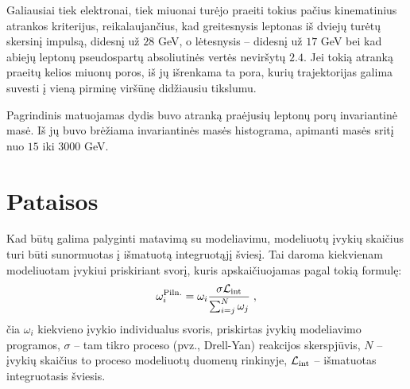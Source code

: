 \documentclass[a4paper, 12pt]{article}
\newcommand{\Lumi}{{\cal L}_\mathrm{int}}
\newlength\q
\begin{document}
Galiausiai tiek elektronai, tiek miuonai turėjo praeiti tokius pačius kinematinius atrankos kriterijus,
reikalaujančius, kad greitesnysis leptonas iš dviejų turėtų skersinį impulsą, didesnį už $28$ GeV, o lėtesnysis --
didesnį už $17$ GeV bei kad abiejų leptonų pseudospartų absoliutinės vertės neviršytų $2.4$.
Jei tokią atranką praeitų kelios miuonų poros, iš jų išrenkama ta pora, kurių trajektorijas galima suvesti į
vieną pirminę viršūnę didžiausiu tikslumu.

Pagrindinis matuojamas dydis buvo atranką praėjusių leptonų porų invariantinė masė.
Iš jų buvo brėžiama invariantinės masės histograma, apimanti masės sritį nuo $15$ iki $3000$ GeV.


\section{Pataisos}\label{sec:corrections}
Kad būtų galima palyginti matavimą su modeliavimu, modeliuotų įvykių skaičius turi būti sunormuotas
į išmatuotą integruotąjį šviesį.
Tai daroma kiekvienam modeliuotam įvykiui priskiriant svorį, kuris apskaičiuojamas pagal tokią formulę:
\begin{equation}
	\omega_{i}^{\mathrm{Piln.}} = \omega_{i} \frac{ \sigma\Lumi }{ \sum_{i=j}^{N}\omega_{j} } \; ,
	\label{eq:NLOweight}
\end{equation}
čia $\omega_{i}$ kiekvieno įvykio individualus svoris, priskirtas įvykių modeliavimo programos,
$\sigma$ -- tam tikro proceso (pvz., Drell-Yan) reakcijos skerspjūvis, $N$ -- įvykių skaičius to
proceso modeliuotų duomenų rinkinyje, $\Lumi$ -- išmatuotas integruotasis šviesis.
\end{document}
